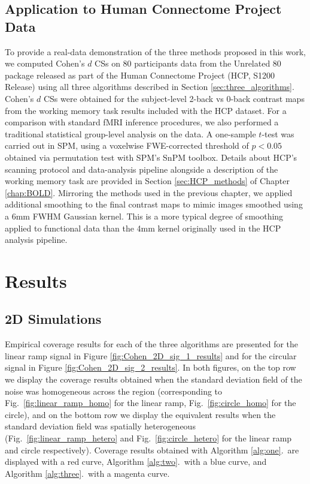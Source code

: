 \subsection{Application to Human Connectome Project Data}
To provide a real-data demonstration of the three methods proposed in this work, we computed Cohen's $d$ CSs on 80 participants data from the Unrelated 80 package released as part of the Human Connectome Project (HCP, S1200 Release) using all three algorithms described in Section \ref{sec:three_algorithms}. Cohen's $d$ CSs were obtained for the subject-level 2-back vs 0-back contrast maps from the working memory task results included with the HCP dataset. For a comparison with standard fMRI inference procedures, we also performed a traditional statistical group-level analysis on the data. A one-sample $t$-test was carried out in SPM, using a voxelwise FWE-corrected threshold of $p < 0.05$ obtained via permutation test with SPM's SnPM toolbox. Details about HCP's scanning protocol and data-analysis pipeline alongside a description of the working memory task are provided in Section \ref{sec:HCP_methods} of Chapter \ref{chap:BOLD}. Mirroring the methods used in the previous chapter, we applied additional smoothing to the final contrast maps to mimic images smoothed using a 6mm FWHM Gaussian kernel. This is a more typical degree of smoothing applied to functional data than the 4mm kernel originally used in the HCP analysis pipeline.

\section{Results}
\label{sec:simulation_results}
\subsection{2D Simulations} 
\label{sec:2D_sim_results}

Empirical coverage results for each of the three algorithms are presented for the linear ramp signal in Figure \ref{fig:Cohen_2D_sig_1_results} and for the circular signal in Figure \ref{fig:Cohen_2D_sig_2_results}. In both figures, on the top row we display the coverage results obtained when the standard deviation field of the noise was homogeneous across the region (corresponding to Fig.\ \ref{fig:linear_ramp_homo} for the linear ramp, Fig.\ \ref{fig:circle_homo} for the circle), and on the bottom row we display the equivalent results when the standard deviation field was spatially heterogeneous (Fig.\ \ref{fig:linear_ramp_hetero} and Fig.\ \ref{fig:circle_hetero} for the linear ramp and circle respectively). Coverage results obtained with Algorithm \ref{alg:one}.\ are displayed with a red curve, Algorithm \ref{alg:two}.\ with a blue curve, and Algorithm \ref{alg:three}.\ with a magenta curve.

